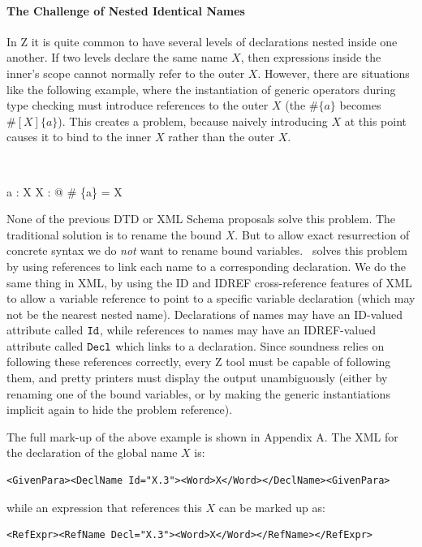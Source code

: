 \documentclass{llncs}  %
\begin{document}
\paragraph{The Challenge of Nested Identical Names}

In Z it is quite common to have several levels of declarations nested 
inside one another.  If two levels declare the same name $X$, then
expressions inside the inner's scope cannot normally refer to the outer $X$.
However, there are situations like the following example, where the
instantiation of generic operators during type checking must
introduce references to the outer $X$ (the $\# \{a\}$ becomes
$\#[X]\{a\}$). This creates a problem, because naively introducing
$X$ at this point causes it to bind to the inner $X$ rather than 
the outer $X$. 
\begin{zed}
    [X] \\
\end{zed}
\begin{axdef}
    a : X
\where
    \exists X : \nat @ \# \{a\} = X
\end{axdef}


None of the previous DTD or XML Schema proposals solve this problem.
The traditional solution is to rename the bound $X$.  But
to allow exact resurrection of concrete syntax we do \emph{not} want to
rename bound variables.  \CADiZ\ solves this problem by using references
to link each name to a corresponding declaration.
We do the same thing in XML, by using the ID and IDREF
cross-reference features of XML to allow a variable reference to point to
a specific variable declaration (which may not be the nearest nested
name).  Declarations of names may have an ID-valued attribute called
${\tt Id}$, while references to names may have an IDREF-valued attribute
called ${\tt Decl}$ which links to a declaration.  Since soundness relies
on following these references correctly, 
every Z tool must be capable of following them, and pretty printers must
display the output unambiguously (either by renaming one of the bound
variables, or by making the generic instantiations implicit again to hide
the problem reference).  

The full mark-up of the above example is shown in Appendix A.
The XML for the declaration of the global name $X$ is:
\begin{small}
\begin{verbatim}
<GivenPara><DeclName Id="X.3"><Word>X</Word></DeclName><GivenPara>
\end{verbatim}
\end{small}
while an expression that references this $X$ can be marked up as:
\begin{small}
\begin{verbatim}
<RefExpr><RefName Decl="X.3"><Word>X</Word></RefName></RefExpr>
\end{verbatim}
\end{small}
\end{document}
